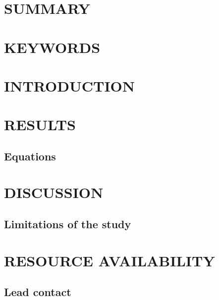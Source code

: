 \documentclass[12pt,letterpaper]{article}
\date{}
\makeatletter
\renewcommand{\maketitle}{\bgroup\setlength{\parindent}{0pt}
\begin{flushleft}
  \textbf{\@title}
  
  \@author
\end{flushleft}\egroup}
\makeatother
\begin{document}
\maketitle

\section*{SUMMARY}


\section*{KEYWORDS}


\section*{INTRODUCTION}


\section*{RESULTS}


\subsection*{Equations}


\section*{DISCUSSION}


\subsection*{Limitations of the study}



\newpage

\section*{RESOURCE AVAILABILITY}
\subsection*{Lead contact}

\end{document}
